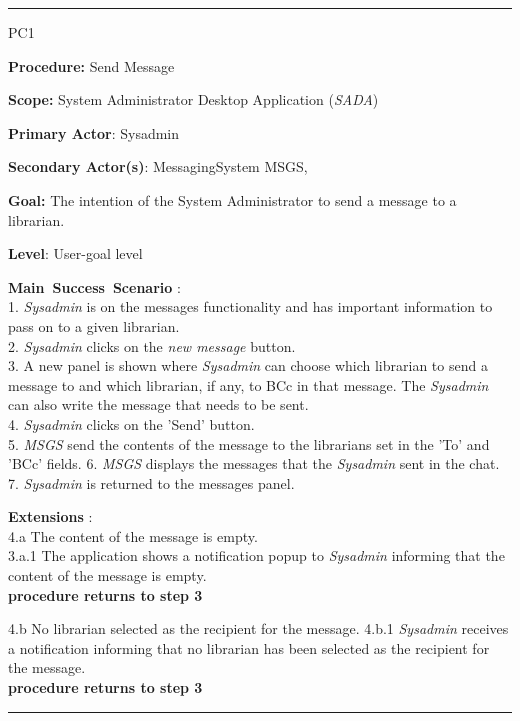 \vspace{0.5cm}
\hrule
\begin{lyxlist}{PC1}
\small{
\item [\textbf{Procedure:}] Send Message
\item [\textbf{Scope:}] System Administrator Desktop Application (\emph{SADA})
\item [\textbf{Primary Actor}:] Sysadmin
\item [\textbf{Secondary Actor(s)}:] MessagingSystem MSGS,
\item [\textbf{Goal:}] The intention of the System Administrator to send a
message to a librarian.
\item [\textbf{Level}:] User-goal level
\item [\textbf{Main~Success~Scenario}]:\\
1. \emph{Sysadmin} is on the messages functionality and has important
information to pass on to a given librarian.
\\
2. \emph{Sysadmin} clicks on the \emph{new message} button. \\
3. A new panel is shown where \emph{Sysadmin} can choose which librarian to
send a message to and which librarian, if any, to BCc in that message. The
\emph{Sysadmin} can also write the message that needs to be sent.
\\
4. \emph{Sysadmin} clicks on the 'Send' button. \\
5. \emph{MSGS} send the contents of the message to the librarians set in the
'To' and 'BCc' fields.
6. \emph{MSGS} displays the messages that the \emph{Sysadmin} sent in the chat.
\\
7. \emph{Sysadmin} is returned to the messages panel. \\



\item [\textbf{Extensions}]: \\
4.a The content of the message is empty.\\
\hspace*{0.5cm} 3.a.1 The application shows a notification popup to
\emph{Sysadmin} informing that the content of the message is empty. \\
\hspace*{0.5cm} \textbf{procedure returns to step 3}

4.b No librarian selected as the recipient for the message.
\hspace*{0.5cm} 4.b.1 \emph{Sysadmin} receives a notification informing that
no librarian has been selected as the recipient for the message.\\
\hspace*{0.5cm} \textbf{procedure returns to step 3}}

\end{lyxlist}
\hrule

